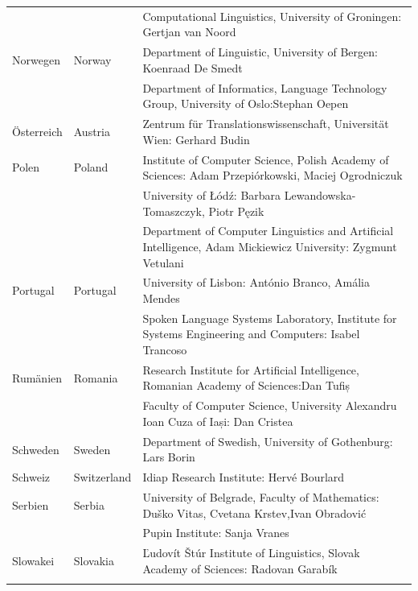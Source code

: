\documentclass[]{../../metanetpaper}
\begin{document}
\begin{longtable}{@{}llp{113mm}@{}}
  & & Computational Linguistics, University of Groningen: Gertjan van Noord\\ \addlinespace
  Norwegen & \textcolor{grey1}{Norway} & Department of Linguistic, University of Bergen: Koenraad De Smedt\\ \addlinespace 
  & & Department of Informatics, Language Technology Group, University of Oslo:\newline Stephan Oepen \\ \addlinespace
  Österreich & \textcolor{grey1}{Austria} & Zentrum für Translationswissenschaft, Universität Wien: Gerhard Budin\\ \addlinespace 
  Polen & \textcolor{grey1}{Poland} & Institute of Computer Science, Polish Academy of Sciences: Adam Przepiórkowski, Maciej Ogrodniczuk \\ \addlinespace
  & & University of Łódź: Barbara Lewandowska-Tomaszczyk, Piotr Pęzik\\ \addlinespace
  & & Department of Computer Linguistics and Artificial Intelligence, Adam Mickiewicz University: Zygmunt Vetulani \\ \addlinespace
  Portugal & \textcolor{grey1}{Portugal} & University of Lisbon: António Branco, Amália Mendes \\ \addlinespace
  & & Spoken Language Systems Laboratory, Institute for Systems Engineering and Computers: Isabel Trancoso \\ \addlinespace
  Rumänien & \textcolor{grey1}{Romania} & Research Institute for Artificial Intelligence, Romanian Academy of Sciences:\newline Dan Tufiș \\ \addlinespace
  & & Faculty of Computer Science, University Alexandru Ioan Cuza of Iași: Dan Cristea \\ \addlinespace
  Schweden & \textcolor{grey1}{Sweden} & Department of Swedish, University of Gothenburg: Lars Borin \\ \addlinespace 
  Schweiz & \textcolor{grey1}{Switzerland} & Idiap Research Institute: Hervé Bourlard \\ \addlinespace 
  Serbien & \textcolor{grey1}{Serbia} & University of Belgrade, Faculty of Mathematics: Duško Vitas, Cvetana Krstev,\newline Ivan Obradović \\ \addlinespace
  & & Pupin Institute: Sanja Vranes \\ \addlinespace  
  Slowakei & \textcolor{grey1}{Slovakia} & Ľudovít Štúr Institute of Linguistics, Slovak Academy of Sciences: Radovan Garabík \\ \addlinespace 

\end{longtable}
\end{document}
